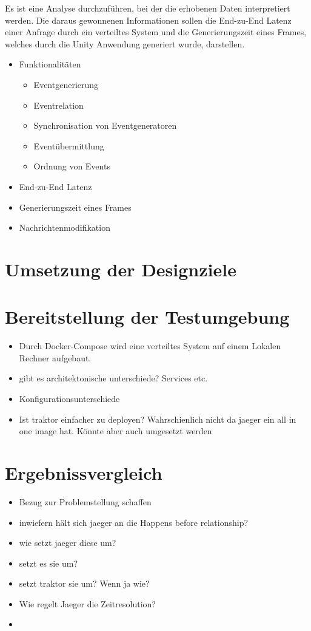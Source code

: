Es ist eine Analyse durchzuführen, bei der die erhobenen Daten interpretiert werden. Die daraus gewonnenen Informationen sollen die End-zu-End Latenz einer Anfrage durch ein verteiltes System und die Generierungszeit eines Frames, welches durch die Unity Anwendung generiert wurde, darstellen.
\begin{itemize}
	\item Funktionalitäten
		\begin{itemize}
			\item Eventgenerierung
			\item Eventrelation
			\item Synchronisation von Eventgeneratoren
			\item Eventübermittlung
			\item Ordnung von Events
		\end{itemize}
	\item End-zu-End Latenz
	\item Generierungszeit eines Frames
	\item Nachrichtenmodifikation
\end{itemize}

\section{Umsetzung der Designziele}
\label{section:Umsetzung der Designziele}
\section{Bereitstellung der Testumgebung}
\label{section:Bereitstellung der Testumgebung}
\begin{itemize}
	\item Durch Docker-Compose wird eine verteiltes System auf einem Lokalen Rechner aufgebaut.
	\item gibt es architektonische unterschiede? Services etc. 
	\item Konfigurationsunterschiede
	\item Ist traktor einfacher zu deployen? Wahrschienlich nicht da jaeger ein all in one image hat. Könnte aber auch umgesetzt werden
\end{itemize}
\section{Ergebnissvergleich}
\label{section:Ergebnissvergleich}


\begin{itemize}
	\item Bezug zur Problemstellung schaffen
	\item inwiefern hält sich jaeger an die Happens before relationship?
	\item wie setzt jaeger diese um?
	\item setzt es sie um?
	\item setzt traktor sie um? Wenn ja wie?
	\item Wie regelt Jaeger die Zeitresolution?
	\item  
\end{itemize}
